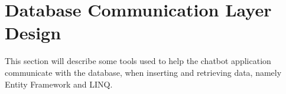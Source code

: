 \section{Database Communication Layer Design}
\label{section:database_communication_layer_design}

This section will describe some tools used to help the chatbot application communicate with the database, when inserting and retrieving data, namely Entity Framework and LINQ.